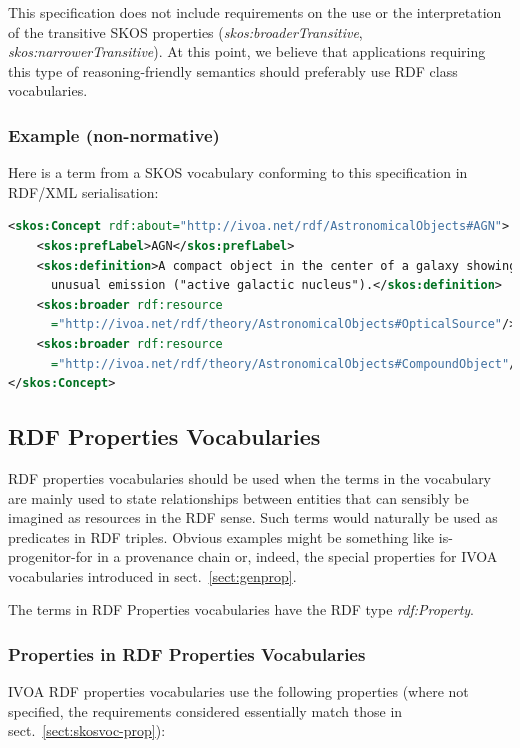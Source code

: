 \documentclass[11pt,a4paper]{ivoa}
\newcommand{\vocterm}[1]{\emph{\color{termcolor}#1}}
\begin{document}
This specification does not include requirements on the use or the
interpretation of the transitive SKOS properties
(\vocterm{skos:broaderTransitive}, \vocterm{skos:narrowerTransitive}).
At this point, we believe that applications requiring this type of
reasoning-friendly semantics should preferably use RDF class
vocabularies.

\subsubsection{Example (non-normative)}

Here is a term from a SKOS vocabulary conforming to this specification
in RDF/XML serialisation:

\begin{lstlisting}[language=XML]
<skos:Concept rdf:about="http://ivoa.net/rdf/AstronomicalObjects#AGN">
	<skos:prefLabel>AGN</skos:prefLabel>
	<skos:definition>A compact object in the center of a galaxy showing 
	  unusual emission ("active galactic nucleus").</skos:definition>
	<skos:broader rdf:resource
	  ="http://ivoa.net/rdf/theory/AstronomicalObjects#OpticalSource"/>
	<skos:broader rdf:resource
	  ="http://ivoa.net/rdf/theory/AstronomicalObjects#CompoundObject"/>
</skos:Concept>
\end{lstlisting}

\subsection{RDF Properties Vocabularies}
\label{sect:refpropvoc}

RDF properties vocabularies should be used when the terms in the
vocabulary are mainly used to state
relationships between entities that can sensibly be imagined as
resources in the RDF sense.  Such terms would naturally be used as
predicates in RDF triples.  Obvious examples might be something
like is-progenitor-for in a provenance chain or, indeed, the special
properties for IVOA vocabularies introduced in sect.~\ref{sect:genprop}.


The terms in RDF Properties vocabularies have the RDF type 
\vocterm{rdf:Property}.

\subsubsection{Properties in RDF Properties Vocabularies}
\label{sect:propvoc-prop}

IVOA RDF properties vocabularies use the following properties (where
not specified, the requirements considered essentially match those in
sect.~\ref{sect:skosvoc-prop}):
\end{document}
